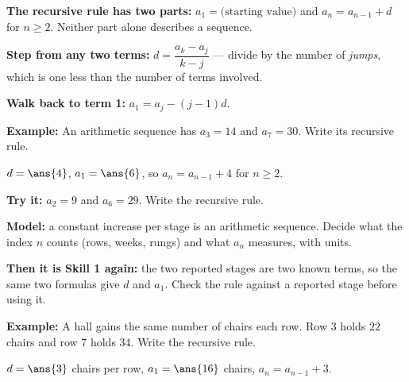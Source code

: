 \documentclass[12pt]{article}
\begin{document}


\begin{formulabox}
\textbf{The recursive rule has two parts:} $a_1 = \text{(starting value)}$ and $a_n = a_{n-1} + d$ for $n \ge 2$. Neither part alone describes a sequence.\par
\textbf{Step from any two terms:} $d = \dfrac{a_k - a_j}{k - j}$ --- divide by the number of \emph{jumps}, which is one less than the number of terms involved.\par
\textbf{Walk back to term 1:} $a_1 = a_j - (j-1)d$.
\end{formulabox}

\begin{examplebox}
\textbf{Example:} \quad An arithmetic sequence has $a_3 = 14$ and $a_7 = 30$. Write its recursive rule.

$d = \ans{4}$, \quad $a_1 = \ans{6}$, \quad so $a_n = a_{n-1} + 4$ for $n \ge 2$.
\end{examplebox}

\begin{tryitbox}
\textbf{Try it:} \quad $a_2 = 9$ and $a_6 = 29$. Write the recursive rule.\\[2pt]
\end{tryitbox}


\begin{formulabox}
\textbf{Model:} a constant increase per stage is an arithmetic sequence. Decide what the index $n$ counts (rows, weeks, rungs) and what $a_n$ measures, with units.\par
\textbf{Then it is Skill 1 again:} the two reported stages are two known terms, so the same two formulas give $d$ and $a_1$. Check the rule against a reported stage before using it.
\end{formulabox}

\begin{examplebox}
\textbf{Example:} \quad A hall gains the same number of chairs each row. Row $3$ holds $22$ chairs and row $7$ holds $34$. Write the recursive rule.

$d = \ans{3}$ chairs per row, \quad $a_1 = \ans{16}$ chairs, \quad $a_n = a_{n-1} + 3$.
\end{examplebox}
\end{document}
